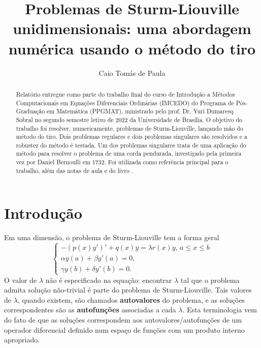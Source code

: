 \documentclass[twocolumn,showpacs,%
  nofootinbib,aps,superscriptaddress,%
  eqsecnum,prd,notitlepage,showkeys,10pt]{revtex4-1}
\renewcommand{\leq}{\leqslant}
\begin{document}
\title{
Problemas de Sturm-Liouville unidimensionais: 
uma abordagem numérica usando o método do tiro
}
\author{Caio Tomás de Paula}
%
\begin{abstract}
    Relatório entregue como parte do trabalho final do curso de Introdução a
    Métodos Computacionais em Equações Diferenciais Ordinárias (IMCEDO) do
    Programa de Pós-Graduação em Matemática (PPGMAT),
    ministrado pelo prof. Dr. Yuri Dumaresq Sobral no segundo semestre letivo
    de 2022 da Universidade de Brasília.
    O objetivo do trabalho foi resolver, numericamente, problemas de Sturm-Liouville,
    lançando mão do método do tiro. Dois problemas regulares e dois problemas singulares
    são resolvidos e a robustez do método é testada.
    Um dos problemas singulares trata de uma aplicação do método
    para resolver o problema de uma corda pendurada, investigado pela primeira vez por Daniel Bernoulli
    em 1732.
    Foi utilizada 
    \cite{Sturm-Liouville} como referência principal para o trabalho, além
    das notas de aula \cite{notas-aula-IMCEDO} e do livro \cite{iserles2008}.
\end{abstract}
%
\maketitle
%
\section{Introdução}
%
Em uma dimensão, o problema de Sturm-Liouville tem a forma geral
%
\begin{equation}
\label{eq:forma-geral-SL-1D}
    \left\{
    \begin{array}{l}
        -(p(x)y')' + q(x)y = \lambda r(x)y, \, a \leq x \leq b \\ 
        \alpha y(a) + \beta y'(a) = 0, \\ 
        \gamma y(b) + \delta y'(b) = 0.
    \end{array}
    \right.
\end{equation}
%
O valor de $\lambda$ não é especificado na equação: encontrar $\lambda$
tal que o problema admita solução não-trivial é parte do problema de Sturm-Liouville.
Tais valores de $\lambda$, quando existem, são chamados \textbf{autovalores}
do problema, e as soluções correspondentes são as \textbf{autofunções} associadas
a cada $\lambda$. Esta terminologia vem do fato de que as soluções correspondem
aos autovalores/autofunções de um operador diferencial definido num espaço
de funções com um produto interno apropriado. 
\end{document}
